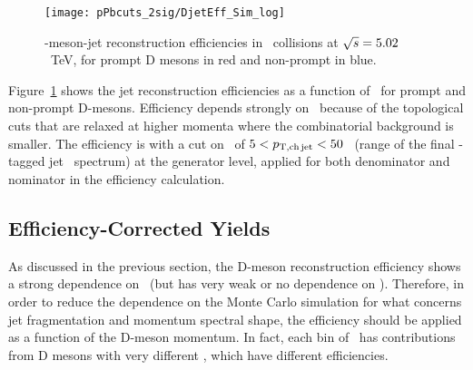 \begin{figure}[bth]
\centering
\texttt{[image: pPbcuts\_2sig/DjetEff\_Sim\_log]}
\caption{\Dzero-meson-jet reconstruction efficiencies in \pp\ collisions at $\sqrt{s}=5.02$~TeV, for prompt D mesons in red and non-prompt in blue.}
\label{fig:eq_pp_DrecEff}
\end{figure}

Figure~\ref{fig:eq_pp_DrecEff} shows the \Dzero\-jet reconstruction efficiencies as a function of \ptd\, 
for prompt and non-prompt D-mesons. Efficiency depends strongly on \ptd\ because of the topological cuts that are relaxed at higher momenta where the combinatorial background is smaller. 
The efficiency is with a cut on \ptchjet\ of $5 < p_{\mathrm{T,ch\, jet}} < 50$ \GeVc\ (range of the final \Dzero-tagged jet \pt\ spectrum) at the generator level, applied for both denominator and nominator in the efficiency calculation.


\subsection{Efficiency-Corrected Yields}

As discussed in the previous section, the D-meson reconstruction efficiency shows a strong dependence on \ptd\ (but has very weak or no dependence on \ptjet).
Therefore, in order to reduce the dependence on the Monte Carlo simulation for what concerns jet fragmentation and momentum spectral shape,
the efficiency should be applied as a function of the D-meson momentum. In fact, each bin of \ptjet\ has contributions from D mesons with very different \ptd, which have different efficiencies.

